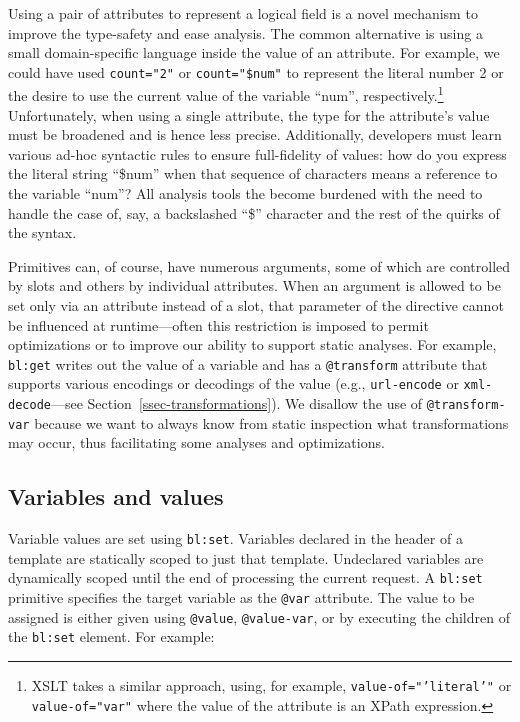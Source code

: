 \documentclass{www2003-submission}
\newcommand{\smtexttt}[1]{{\small\texttt{#1}}}
\newcommand{\ssecref}[1]{Section~\ref{ssec-#1}}
\begin{document}
Using a pair of attributes to represent a logical field is a novel
mechanism to improve the type-safety and ease analysis.  The common
alternative is using a small domain-specific language inside the value
of an attribute.  For example, we could have used \smtexttt{count="2"}
or \smtexttt{count="\$num"} to represent the literal number 2 or the
desire to use the current value of the variable ``num'',
respectively.\footnote{XSLT takes a similar approach, using, for example,
\smtexttt{value-of="'literal'"} or \smtexttt{value-of="var"} where the
value of the attribute is an XPath expression.}
Unfortunately, when using a single attribute, the type for the
attribute's value must be broadened and is hence less precise.
Additionally, developers must learn various ad-hoc syntactic rules to
ensure full-fidelity of values:  how do you express the literal string
``\$num'' when that sequence of characters means a reference to the
variable ``num''?  All analysis tools the become burdened with the
need to handle the case of, say, a backslashed ``\$'' character and
the rest of the quirks of the syntax.

Primitives can, of course, have numerous arguments, some of which are
controlled by slots and others by individual attributes.  When an
argument is allowed to be set only via an attribute instead of a slot,
that parameter of the directive cannot be influenced at
runtime---often this restriction is imposed to permit optimizations or
to improve our ability to support static analyses.  For example,
\smtexttt{bl:get} writes out the value of a variable and has a
\smtexttt{@transform} attribute that supports various encodings or
decodings of the value (e.g., \smtexttt{url-encode} or
\smtexttt{xml-decode}---see \ssecref{transformations}).  We disallow the
use of \smtexttt{@transform-var} because we want to always know from
static inspection what transformations may occur, thus facilitating
some analyses and optimizations.

\subsection{Variables and values}
\label{ssec-variables}

Variable values are set using \smtexttt{bl:set}.  Variables
declared in the header of a template are statically scoped to just
that template.   Undeclared variables are dynamically scoped until the
end of processing the current request.  A \smtexttt{bl:set} primitive
specifies the target variable as the \smtexttt{@var} attribute. The
value to be assigned is either given using \smtexttt{@value},
\smtexttt{@value-var}, or by executing the children of the
\smtexttt{bl:set} element.  For example:
\end{document}

